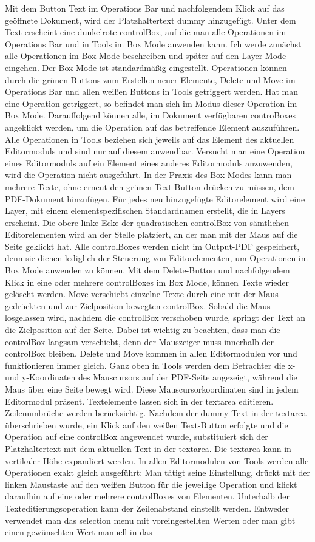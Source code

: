 Mit dem Button Text im Operations Bar und nachfolgendem Klick auf das geöffnete Dokument, wird der Platzhaltertext dummy hinzugefügt. Unter dem Text erscheint eine dunkelrote controlBox, auf die man alle Operationen im Operations Bar und in Tools im Box Mode anwenden kann. Ich werde zunächst alle Operationen im Box Mode beschreiben und später auf den Layer Mode eingehen. Der Box Mode ist standardmäßig eingestellt. Operationen können durch die grünen Buttons zum Erstellen neuer Elemente, Delete und Move im Operations Bar und allen weißen Buttons in Tools getriggert werden. Hat man eine Operation getriggert, so befindet man sich im Modus dieser Operation im Box Mode. Darauffolgend können alle, im Dokument verfügbaren controBoxes angeklickt werden, um die Operation auf das betreffende Element auszuführen. Alle Operationen in Tools beziehen sich jeweils auf das Element des aktuellen Editormoduls und sind nur auf diesem anwendbar. Versucht man eine Operation eines Editormoduls auf ein Element eines anderes Editormoduls anzuwenden, wird die Operation nicht ausgeführt. In der Praxis des Box Modes kann man mehrere Texte, ohne erneut den grünen Text Button drücken zu müssen, dem PDF-Dokument hinzufügen. Für jedes neu hinzugefügte Editorelement wird eine Layer, mit einem elementspezifischen Standardnamen erstellt, die in Layers erscheint. Die obere linke Ecke der quadratischen controlBox von sämtlichen Editorelementen wird an der Stelle platziert, an der man mit der Maus auf die Seite geklickt hat. Alle controlBoxes werden nicht im  Output-PDF gespeichert, denn sie dienen lediglich der Steuerung von Editorelementen, um Operationen im Box Mode anwenden zu können. Mit dem Delete-Button und nachfolgendem Klick in eine oder mehrere controlBoxes im Box Mode, können Texte wieder gelöscht werden. Move verschiebt einzelne Texte durch eine mit der Maus gedrückten und zur Zielposition bewegten controlBox. Sobald die Maus losgelassen wird, nachdem die controlBox verschoben wurde, springt der Text an die Zielposition auf der Seite. Dabei ist wichtig zu beachten, dass man die controlBox langsam verschiebt, denn der Mauszeiger muss innerhalb der controlBox bleiben. Delete und Move kommen in allen Editormodulen vor und funktionieren immer gleich. Ganz oben in Tools werden dem Betrachter die x- und y-Koordinaten des Mauscursors auf der PDF-Seite angezeigt, während die Maus über eine Seite bewegt wird. Diese Mauscursorkoordinaten sind in jedem Editormodul präsent. Textelemente lassen sich in der textarea editieren. Zeilenumbrüche werden berücksichtig. Nachdem der dummy Text in der textarea überschrieben wurde, ein Klick auf den weißen Text-Button erfolgte und die Operation auf eine controlBox angewendet wurde, substituiert sich der Platzhaltertext mit dem aktuellen Text in der textarea. Die textarea kann in vertikaler Höhe expandiert werden. In allen Editormodulen von Tools werden alle Operationen exakt gleich ausgeführt: Man tätigt seine Einstellung, drückt mit der linken Maustaste auf den weißen Button für die jeweilige Operation und klickt daraufhin auf eine oder mehrere controlBoxes von Elementen. Unterhalb der Texteditierungsoperation kann der Zeilenabstand einstellt werden. Entweder verwendet man das selection menu mit voreingestellten Werten oder man gibt einen gewünschten Wert manuell in das 